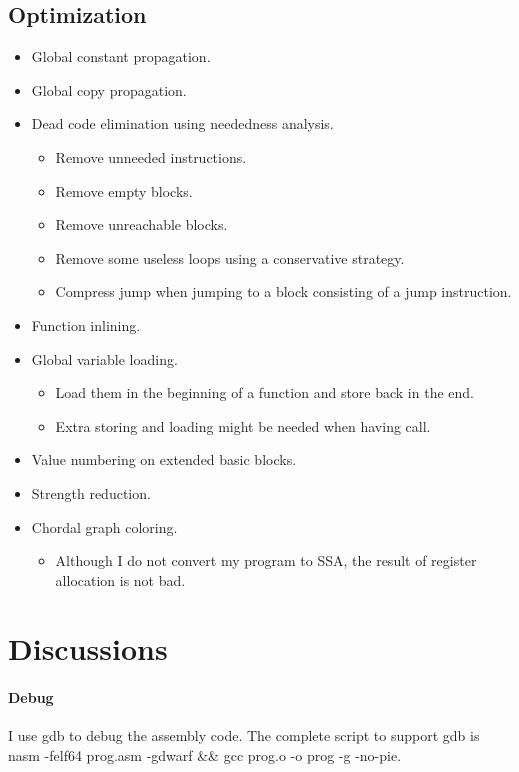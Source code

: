 \documentclass[12pt, a4paper]{article}
\begin{document}
\subsection{Optimization}

\begin{itemize}
	\item 
	Global constant propagation.
	\item 
	Global copy propagation.
	\item
	Dead code elimination using neededness analysis.
	\begin{itemize}
		\item Remove unneeded instructions.
		\item Remove empty blocks.
		\item Remove unreachable blocks.
		\item Remove some useless loops using a conservative strategy.
		\item
		Compress {\ttfamily jump} when jumping to a block consisting of a {\ttfamily jump} instruction.
	\end{itemize}
	\item
	Function inlining.
	\item 
	Global variable loading. 
	\begin{itemize}
		\item 
		Load them in the beginning of a function and store back in the end.
		\item
		Extra storing and loading might be needed when having {\ttfamily call}.
	\end{itemize}
	\item 
	Value numbering on extended basic blocks.
	\item 
	Strength reduction.
	\item
	Chordal graph coloring. 
	\begin{itemize}
		\item 
		Although I do not convert my program to SSA, the result of register allocation is not bad.
	\end{itemize}
\end{itemize}

\section{Discussions}

\paragraph{Debug}
I use gdb to debug the assembly code. The complete script to support gdb is {\ttfamily nasm -felf64 prog.asm -gdwarf \&\& gcc prog.o -o prog -g -no-pie}.
\end{document}
